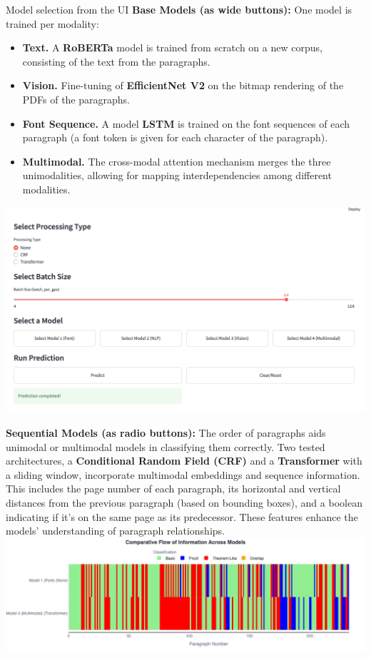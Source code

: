\documentclass[final]{beamer}
\newlength{\colwidth}
\begin{document}
\begin{frame}[t]
\begin{columns}[t]
\begin{column}{\colwidth}
			\begin{block}{Model selection from the UI}
				\textbf{Base Models (as wide buttons):} One model is trained per modality:
				\begin{itemize}
					\item \textbf{Text.} A \textbf{RoBERTa} model is trained from scratch on a new corpus, consisting of the text from the paragraphs.
					\item \textbf{Vision.} Fine-tuning of \textbf{EfficientNet V2} on the bitmap rendering of the PDFs of the paragraphs.
					\item \textbf{Font Sequence.} A model \textbf{LSTM} is trained on the font sequences of each paragraph (a font token is given for each character of the paragraph).
					\item \textbf{Multimodal.} The cross-modal attention mechanism merges the three unimodalities, allowing for mapping interdependencies among different modalities.
				\end{itemize}

				\includegraphics[width=\linewidth]{buttons.png}

				\textbf{Sequential Models (as radio buttons):} The order of paragraphs aids unimodal or multimodal models in classifying them correctly. Two tested architectures, a \textbf{Conditional Random Field (CRF)} and a \textbf{Transformer} with a sliding window, incorporate multimodal embeddings and sequence information. This includes the page number of each paragraph, its horizontal and vertical distances from the previous paragraph (based on bounding boxes), and a boolean indicating if it's on the same page as its predecessor. These features enhance the models' understanding of paragraph relationships.
				\includegraphics[width=\linewidth]{comparitive-v3.png}


\end{block}
\end{column}
\end{columns}
\end{frame}
\end{document}
